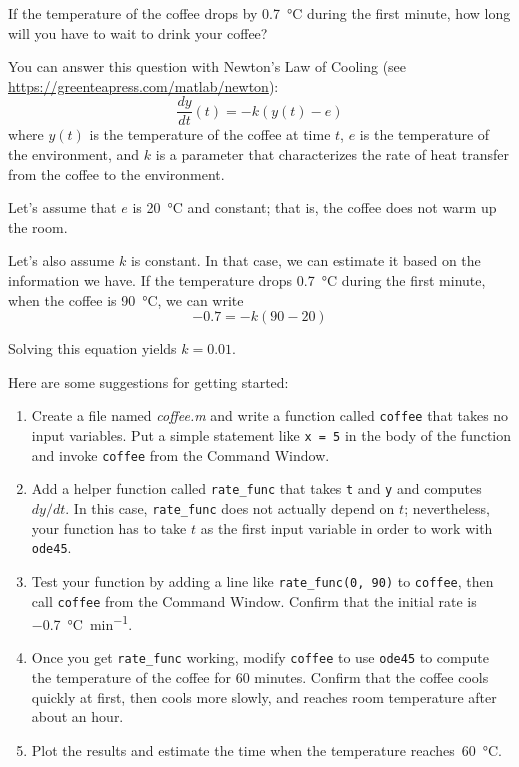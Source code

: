 If the temperature of the coffee drops by \SI{0.7}{\celsius} during the first minute, how long will you have to wait to drink your coffee?

You can answer this question with Newton's Law of Cooling (see \linebreak \url{https://greenteapress.com/matlab/newton}):
%
\begin{equation*}
\frac{dy}{dt}(t) = -k (y(t) - e)
\end{equation*}
%
where $y(t)$ is the temperature of the coffee at time $t$,
$e$ is the temperature of the environment, and $k$ is a parameter
that characterizes the rate of heat transfer from the coffee to the environment.

Let's assume that $e$ is \SI{20}{\celsius} and constant; that is, the coffee does not warm up the room.

Let's also assume $k$ is constant.  In that case, we can estimate it based on the information we have.  If the temperature drops \SI{0.7}{\celsius} during the first minute, when the coffee is \SI{90}{\celsius}, we can write
%
\begin{equation*}
-0.7 = -k (90 - 20)
\end{equation*}
%

Solving this equation yields $k = 0.01$.

Here are some suggestions for getting started:

\begin{enumerate}

\item Create a file named \emph{coffee.m} and write a function
called \lstinline{coffee} that takes no input variables.  Put a simple statement like \lstinline{x = 5} in the body of the function and invoke \lstinline{coffee} from the Command \linebreak Window.

\item Add a helper function called \lstinline{rate_func} that takes \lstinline{t} and \lstinline{y} and computes $dy/dt$.  In this case, \lstinline{rate_func} does not actually depend on $t$; nevertheless, your function has to take $t$ as the first input variable in order to work with \lstinline{ode45}.

\item Test your function by adding a line like \lstinline{rate_func(0, 90)}
to \lstinline{coffee}, then call \lstinline{coffee} from the Command Window.
Confirm that the initial rate is \SI{-0.7}{\celsius \per \minute}.

\item Once you get \lstinline{rate_func} working, modify
\lstinline{coffee} to use \lstinline{ode45} to compute the temperature
of the coffee for 60 minutes.  Confirm that
the coffee cools quickly at first, then cools more slowly, and reaches
room temperature after about an hour.

\item Plot the results and estimate the time when the temperature reaches~\SI{60}{\celsius}.

\end{enumerate}






